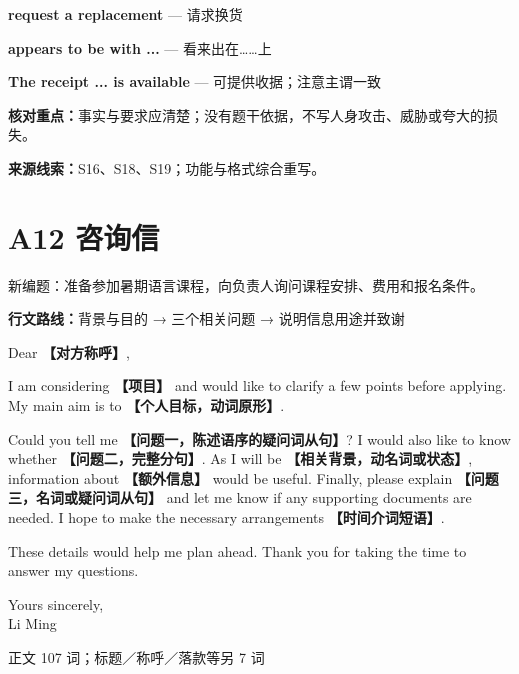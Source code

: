 \documentclass[11pt,a4paper,fontset=macnew]{ctexart}
\newenvironment{writing}{\begingroup\fontsize{10.5}{13.5}\selectfont\setlength{\parskip}{3pt}}{\par\endgroup}
\begin{document}
{\small\textbf{request a replacement} — 请求换货}\par
{\small\textbf{appears to be with ...} — 看来出在……上}\par
{\small\textbf{The receipt ... is available} — 可提供收据；注意主谓一致}\par
{\small\textbf{核对重点：}事实与要求应清楚；没有题干依据，不写人身攻击、威胁或夸大的损失。}\par
{\fontsize{8}{10}\selectfont\textbf{来源线索：}S16、S18、S19；功能与格式综合重写。}\par
\clearpage\section*{A12  咨询信}
{\small 新编题：准备参加暑期语言课程，向负责人询问课程安排、费用和报名条件。}\par
{\small\textbf{行文路线：}背景与目的 → 三个相关问题 → 说明信息用途并致谢}\par
\par\vspace{4pt}{\bfseries 可替换模板}\par\nopagebreak
\begin{writing}
\noindent Dear {\bfseries 【对方称呼】},\par
I am considering {\bfseries 【项目】} and would like to clarify a few points before applying. My main aim is to {\bfseries 【个人目标，动词原形】}.

Could you tell me {\bfseries 【问题一，陈述语序的疑问词从句】}? I would also like to know whether {\bfseries 【问题二，完整分句】}. As I will be {\bfseries 【相关背景，动名词或状态】}, information about {\bfseries 【额外信息】} would be useful. Finally, please explain {\bfseries 【问题三，名词或疑问词从句】} and let me know if any supporting documents are needed. I hope to make the necessary arrangements {\bfseries 【时间介词短语】}.

These details would help me plan ahead. Thank you for taking the time to answer my questions.

\noindent Yours sincerely,\\Li Ming\par
\end{writing}
\par\vspace{4pt}{\bfseries 完整套用示例}\par\nopagebreak
{\small 正文 107 词；标题／称呼／落款等另 7 词}\par
\end{document}
